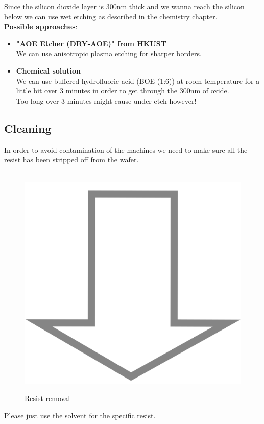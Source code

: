 Since the silicon dioxide layer is 300nm thick and we wanna reach the silicon below we can use wet etching as described in the chemistry chapter.\\

\textbf{Possible approaches}:
\begin{itemize}
	\item \textbf{"AOE Etcher (DRY-AOE)" from HKUST} \\
	We can use anisotropic plasma etching for sharper borders.
	\item \textbf{Chemical solution} \\
	We can use buffered hydrofluoric acid (BOE (1:6)) at room temperature for a little bit over 3 minutes in order to get through the 300nm of oxide.\\
	Too long over 3 minutes might cause under-etch however!
\end{itemize}

\subsection{Cleaning}
In order to avoid contamination of the machines we need to make sure all the resist has been stripped off from the wafer.
\begin{figure}[H]
	\centering
	\begin{tikzpicture}[node distance = 3cm, auto, thick,scale=\CrossSectionOnly, every node/.style={transform shape}]
		
	\end{tikzpicture} \\
	\includegraphics[scale=0.01]{down_arrow.png} \\
	\begin{tikzpicture}[node distance = 3cm, auto, thick,scale=\CrossSectionOnly, every node/.style={transform shape}]
		
	\end{tikzpicture}
	\caption{Resist removal}
\end{figure}
Please just use the solvent for the specific resist.

